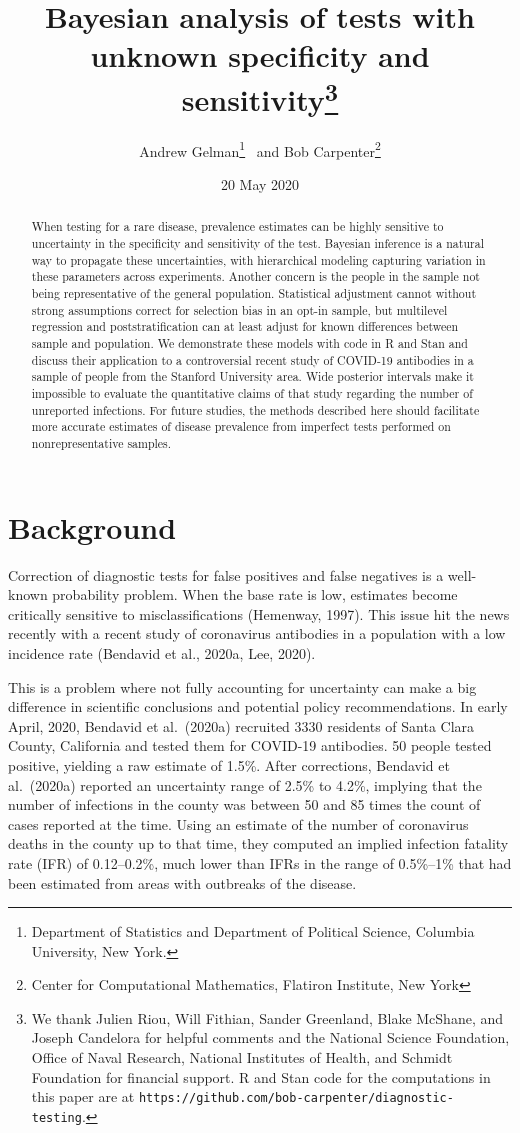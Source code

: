 \documentclass[11pt]{article}
\title{\bf Bayesian analysis of tests with unknown specificity and sensitivity\footnote{We thank Julien Riou, Will Fithian, Sander Greenland, Blake McShane, and Joseph Candelora for helpful comments and the National Science Foundation, Office of Naval Research, National Institutes of Health, and Schmidt Foundation for financial support.  R and Stan code for the computations in this paper are at {\tt https://github.com/bob-carpenter/diagnostic-testing}.}\vspace{.1in}}
\author{Andrew Gelman\footnote{Department of Statistics and Department of
Political Science, Columbia University, New York.}  \ and Bob Carpenter\footnote{Center for Computational Mathematics, Flatiron Institute, New York}
\vspace{.1in}}
\date{20 May 2020}
\begin{document}
\sloppy
\maketitle

\begin{abstract}
When testing for a rare disease, prevalence estimates can be highly sensitive to uncertainty in the specificity and sensitivity of the test.  Bayesian inference is a natural way to propagate these uncertainties, with hierarchical modeling capturing variation in these parameters across experiments.  Another concern is the people in the sample not being representative of the general population.  Statistical adjustment cannot without strong assumptions correct for selection bias in an opt-in sample, but multilevel regression and poststratification can at least adjust for known differences between sample and population.  We demonstrate these models with code in R and Stan and discuss their application to a controversial recent study of COVID-19 antibodies in a sample of people from the Stanford University area.  Wide posterior intervals make it impossible to evaluate the quantitative claims of that study regarding the number of unreported infections.  For future studies, the methods described here should facilitate more accurate estimates of disease prevalence from imperfect tests performed on nonrepresentative samples.
\end{abstract}

\section{Background}

Correction of diagnostic tests for false positives and false negatives is a well-known probability problem.  When the base rate is low, estimates become critically sensitive to misclassifications (Hemenway, 1997).  This issue hit the news recently with a recent study of coronavirus antibodies in a population with a low incidence rate (Bendavid et al., 2020a, Lee, 2020).

This is a problem where not fully accounting for uncertainty can make a big difference in scientific conclusions and potential policy recommendations.  In early April, 2020, Bendavid et al.\ (2020a) recruited 3330 residents of Santa Clara County, California and tested them for COVID-19 antibodies.  50 people tested positive, yielding a raw estimate of 1.5\%.  After corrections, Bendavid et al.\ (2020a) reported an uncertainty range of 2.5\% to 4.2\%, implying that the number of infections in the county was between 50 and 85 times the count of cases reported at the time.  Using an estimate of the number of coronavirus deaths in the county up to that time, they computed an implied infection fatality rate (IFR) of 0.12--0.2\%, much lower than IFRs in the range of 0.5\%--1\% that had been estimated from areas with outbreaks of the disease.
\end{document}
